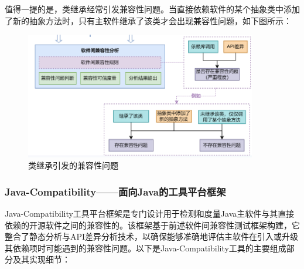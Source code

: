 \documentclass{article}
\begin{document}
值得一提的是，类继承经常引发兼容性问题。当直接依赖软件的某个抽象类中添加了新的抽象方法时，只有主软件继承了该类才会出现兼容性问题，如下图所示：

\begin{figure}[H]
	\centering
	\includegraphics[width=0.9\textwidth]{img/2.png}
	\caption{类继承引发的兼容性问题}
\end{figure}

\subsubsection{Java-Compatibility——面向Java的工具平台框架}

Java-Compatibility工具平台框架是专门设计用于检测和度量Java主软件与其直接依赖的开源软件之间的兼容性的。该框架基于前述软件间兼容性测试框架构建，它整合了静态分析与API差异分析技术，以确保能够准确地评估主软件在引入或升级其依赖项时可能遇到的兼容性问题。以下是Java-Compatibility工具的主要组成部分及其实现细节：
\end{document}
